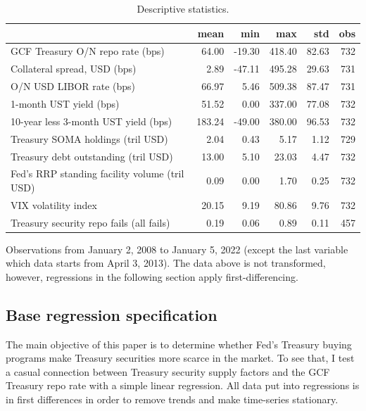 \documentclass[11pt,a4paper,english,oneside]{article}
\begin{document}
\begin{table}[!h] \centering
\begin{threeparttable}
\caption{Descriptive statistics.}
\begin{tabular}{lrrrrr}
\toprule
{} &    mean &    min &     max &    std &  obs \\
\midrule
GCF Treasury O/N repo rate (bps) &   64.00 & -19.30 &  418.40 &  82.63 &  732 \\
Collateral spread, USD (bps) &    2.89 & -47.11 &  495.28 &  29.63 &  731 \\
O/N USD LIBOR rate (bps) &   66.97 &   5.46 &  509.38 &  87.47 &  731 \\
1-month UST yield (bps) &   51.52 &   0.00 &  337.00 &  77.08 &  732 \\
10-year less 3-month UST yield (bps) &  183.24 & -49.00 &  380.00 &  96.53 &  732 \\
Treasury SOMA holdings (tril USD) &    2.04 &   0.43 &    5.17 &   1.12 &  729 \\
Treasury debt outstanding (tril USD) &   13.00 &   5.10 &   23.03 &   4.47 &  732 \\
Fed's RRP standing facility volume (tril USD) &    0.09 &   0.00 &    1.70 &   0.25 &  732 \\
VIX volatility index &   20.15 &   9.19 &   80.86 &   9.76 &  732 \\
Treasury security repo fails (all fails) &    0.19 &   0.06 &    0.89 &   0.11 &  457 \\
\bottomrule
\end{tabular}
Observations from January 2, 2008 to January 5, 2022 (except the last variable which data starts from April 3, 2013). The data above is not transformed, however, regressions in the following section apply first-differencing.
\label{table:stats}
\end{threeparttable}
\end{table}

\subsection{Base regression specification} %

The main objective of this paper is to determine whether Fed's Treasury buying programs make Treasury securities more scarce in the market. To see that, I test a casual connection between Treasury security supply factors and the GCF Treasury repo rate with a simple linear regression. All data put into regressions is in first differences in order to remove trends and make time-series stationary.
\end{document}
